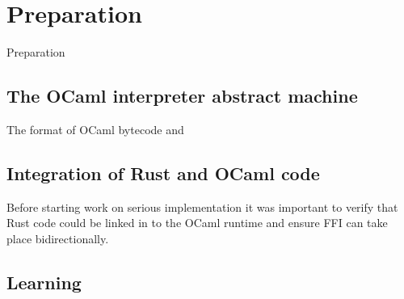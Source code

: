 \chapter{Preparation}

Preparation

\section{The OCaml interpreter abstract machine}

The format of OCaml bytecode and

\section{Integration of Rust and OCaml code}

Before starting work on serious implementation it was important to verify that Rust code could be
linked in to the OCaml runtime and ensure FFI can take place bidirectionally.

\section{Learning}